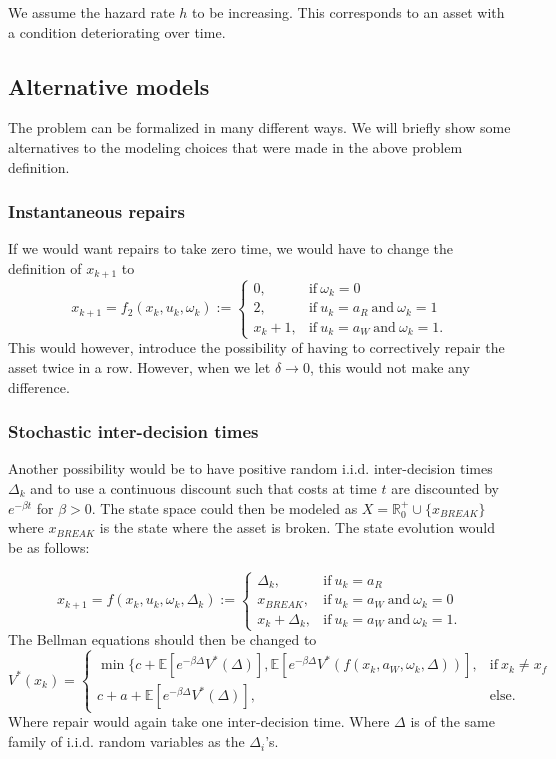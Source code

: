 \begin{assumption}
	We assume the hazard rate $h$ to be increasing.
	This corresponds to an asset with a condition deteriorating over time.
\end{assumption}

\subsection{Alternative models}
The problem can be formalized in many different ways.
We will briefly show some alternatives to the modeling choices that were made in the above problem definition.
\subsubsection{Instantaneous repairs}
If we would want repairs to take zero time, we would have to change the definition of $x_{k+1}$ to 
$$
x_{k+1}=f_2(x_k,u_k,\omega_k):=\begin{cases}
0,&\text{if}\ \omega_k=0 \\
2,&\text{if}\ u_k=a_R\ \text{and}\ \omega_k=1\\
x_k+1,&\text{if}\ u_k=a_W\ \text{and}\ \omega_k=1.
\end{cases}
$$
This would however, introduce the possibility of having to correctively repair the asset twice in a row.
However, when we let $\delta\rightarrow 0$, this would not make any difference.

\subsubsection{Stochastic inter-decision times}
Another possibility would be to have positive random i.i.d. inter-decision times $\Delta_k$ and to use a continuous discount such that costs at time $t$ are discounted by $e^{-\beta t}$ for $\beta>0$.
The state space could then be modeled as $X=\mathbb{R}_0^+\cup\{x_{BREAK}\}$ where $x_{BREAK}$ is the state where the asset is broken.
The state evolution would be as follows:

$$
x_{k+1}=f(x_k,u_k,\omega_k,\Delta_k):=\begin{cases}
\Delta_k,&\text{if}\ u_k=a_R \\
x_{BREAK},&\text{if}\ u_k=a_W\ \text{and}\ \omega_k=0 \\
x_k+\Delta_k,&\text{if}\ u_k=a_W\ \text{and}\ \omega_k=1.
\end{cases}
$$
The Bellman equations should then be changed to
$$
V^*(x_k)=\begin{cases}
\min\{c+\mathbb{E}[e^{-\beta \Delta} V^*(\Delta)],\mathbb{E}[e^{-\beta \Delta} V^*(f(x_k,a_W,\omega_k,\Delta))],&\text{if}\ x_k\neq x_f \\
c+a+\mathbb{E}[e^{-\beta \Delta} V^*(\Delta)],&\text{else.}
\end{cases}
$$
Where repair would again take one inter-decision time. Where $\Delta$ is of the same family of i.i.d. random variables as the $\Delta_i$'s.

